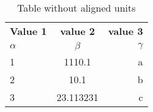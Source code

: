 \documentclass{article}
\begin{document}
 	\begin{table}[h!]
 		\begin{center}
 		\caption{Table without aligned units}
 		\label{tab:table1}
 		\begin{tabular}{l|c|r}
 			\textbf{Value 1} & \textbf{value 2} & \textbf{value 3}\\
 			$\alpha$ & $\beta$ & $\gamma$ \\
 			\hline
              1 & 1110.1 & a\\
                2 & 10.1 & b\\
               3 & 23.113231 & c\\
    \end{tabular}
 		\end{center}
 	\end{table}
 
\end{document}
